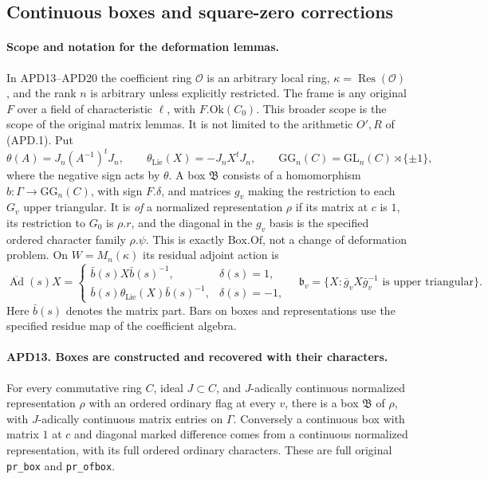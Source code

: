 \documentclass[11pt,a4paper]{article}
\numberwithin{equation}{section}
\theoremstyle{remark}\newtheorem{remark}[theorem]{Remark}
\begin{document}
\subsection{Continuous boxes and square-zero corrections}

\paragraph{Scope and notation for the deformation lemmas.}
In APD13--APD20 the coefficient ring \(\mathcal O\) is an
arbitrary local ring, \(\kappa=\operatorname{Res}(\mathcal O)\),
and the rank \(n\) is arbitrary unless explicitly restricted.
The frame is any original \(F\) over a field of characteristic
\(\ell\), with \(F.\mathrm{Ok}(C_0)\).  This broader scope is
the scope of the original matrix lemmas.  It is not limited to
the arithmetic \(O',R\) of (APD.1).
Put
\[
 \theta(A)=J_n(A^{-1})^tJ_n,\qquad
 \theta_{\mathrm{Lie}}(X)=-J_nX^tJ_n,
 \qquad \mathrm{GG}_n(C)=\mathrm{GL}_n(C)\rtimes\{\pm1\},
                                                               \tag{APD.24}
\]
where the negative sign acts by \(\theta\).  A box
\(\mathfrak B\) consists of a homomorphism
\(b:\Gamma\to\mathrm{GG}_n(C)\), with sign \(F.\delta\),
and matrices \(g_v\) making the restriction to each \(G_v\)
upper triangular.  It is \emph{of} a normalized representation
\(\rho\) if its matrix at \(c\) is \(1\), its restriction
to \(G_0\) is \(\rho.r\), and the diagonal in the \(g_v\)
basis is the specified ordered character family \(\rho.\psi\).
This is exactly \(\mathrm{Box.Of}\), not a change of deformation
problem.  On \(W=M_n(\kappa)\) its residual adjoint action is
\[
 \overline{\operatorname{Ad}}(s)X=
 \begin{cases}
  \bar b(s)X\bar b(s)^{-1},&\delta(s)=1,\\
  \bar b(s)\theta_{\mathrm{Lie}}(X)\bar b(s)^{-1},&\delta(s)=-1,
 \end{cases}
 \quad
 \mathfrak b_v=\{X:\bar g_vX\bar g_v^{-1}
                                    \text{ is upper triangular}\}.
                                                               \tag{APD.25}
\]
Here \(\bar b(s)\) denotes the matrix part.  Bars on boxes
and representations use the specified residue map of the
coefficient algebra.

\paragraph{APD13. Boxes are constructed and recovered with their characters.}
\label{claim:APD13}
For every commutative ring \(C\), ideal \(J\subset C\), and
\(J\)-adically continuous normalized representation \(\rho\)
with an ordered ordinary flag at every \(v\), there is a box
\(\mathfrak B\) of \(\rho\), with \(J\)-adically continuous
matrix entries on \(\Gamma\).  Conversely a continuous box
with matrix \(1\) at \(c\) and diagonal marked difference
comes from a continuous normalized representation, with its full
ordered ordinary characters.  These are full original
\texttt{pr\_\allowbreak box} and \texttt{pr\_\allowbreak ofbox}.
\end{document}
